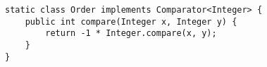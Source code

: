 \begin{verbatim}
static class Order implements Comparator<Integer> {
	public int compare(Integer x, Integer y) {
		return -1 * Integer.compare(x, y);
	}
}
\end{verbatim}